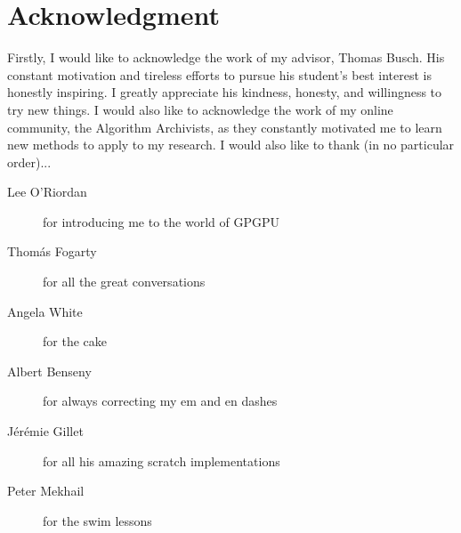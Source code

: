 \chapter*{Acknowledgment}

Firstly, I would like to acknowledge the work of my advisor, Thomas Busch.
His constant motivation and tireless efforts to pursue his student's best interest is honestly inspiring.
I greatly appreciate his kindness, honesty, and willingness to try new things.
I would also like to acknowledge the work of my online community, the Algorithm Archivists, as they constantly motivated me to learn new methods to apply to my research.
I would also like to thank (in no particular order)...
\begin{description}
\item[Lee O'Riordan] for introducing me to the world of GPGPU
\item[Thom\'as Fogarty] for all the great conversations
\item[Angela White] for the cake
\item[Albert Benseny] for always correcting my em and en dashes
\item[J\'er\'emie Gillet] for all his amazing scratch implementations
\item[Peter Mekhail] for the swim lessons
\end{description}
